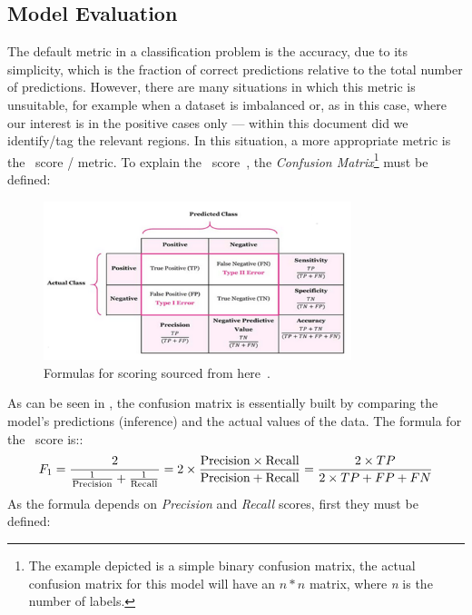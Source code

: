 \subsection{Model Evaluation}
The default metric in a classification problem is the accuracy, due to its simplicity,
which is the fraction of correct predictions relative to the total number of predictions.
However, there are many situations in which this metric is unsuitable, for example when a dataset is imbalanced or,
as in this case, where our interest is in the positive cases only --- within this document did we identify/tag 
the relevant regions. In this situation, a more appropriate metric is the \FO\ score / metric.
To explain the \FO\ score~\autocite{mohajonConfusionMatrixYour2021},
the \emph{Confusion Matrix}\footnote{The example depicted is a simple binary confusion matrix,
	the actual confusion matrix for this model will have an $n * n$ matrix, where \emph{n}
	is the number of labels.} must be defined:
\begin{figure}[H]
	\centering
	\includegraphics[width=0.8\textwidth]{figures/ml_scoring.png}
	\caption[Formulas for scoring]{Formulas for scoring sourced from here~\autocite{leeConfusionMatrixPrecision2021}.}
	\label{fig:f1_score_show_output}
\end{figure}
As can be seen in , the confusion matrix is essentially built by comparing the model's
predictions (inference) and the actual values of the data. The formula for the \FO\ score is::
\[
	F_1 =
	\frac{2}{\frac{1}{\text{Precision}} + \frac{1}{\text{Recall}}}
	=
	2 \times \frac{\text{Precision} \times \text{Recall}}{\text{Precision} + \text{Recall}}
	=
	\frac{2\times {TP} }{2\times{TP}+{FP}+{FN}}
\]
As the formula depends on \emph{Precision} and \emph{Recall} scores, first they must be defined:
